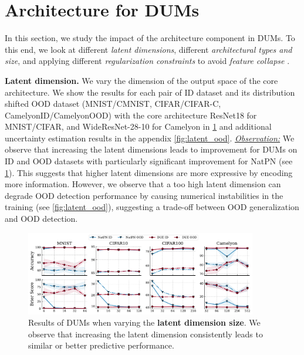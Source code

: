 \section{Architecture for DUMs}
\label{sec:architecture}

In this section, we study the impact of the architecture component in DUMs. To this end, we look at different \emph{latent dimensions}, different \emph{architectural types and size}, and applying different \emph{regularization constraints} to avoid \textit{feature collapse} \citep{van2021due}. 

\textbf{Latent dimension.} We vary the dimension of the output space of the core architecture. We show the results for each pair of ID dataset and its distribution shifted OOD dataset (MNIST/CMNIST, CIFAR/CIFAR-C, CamelyonID/CamelyonOOD) with the core architecture ResNet18 for MNIST/CIFAR, and WideResNet-28-10 for Camelyon in \cref{fig:latent} and additional uncertainty estimation results in the appendix \cref{fig:latent_ood}. \underline{\textit{Observation:}} We observe that increasing the latent dimensions leads to improvement for DUMs on ID and OOD datasets with particularly significant improvement for NatPN (see \cref{fig:latent}). This suggests that higher latent dimensions are more expressive by encoding more information. However, we observe that  a too high latent dimension can degrade OOD detection performance by causing numerical instabilities in the training (see \cref{fig:latent_ood}), suggesting a trade-off between OOD generalization and OOD detection.

\begin{figure}[!htb]
    \centering
    \includegraphics[width=0.9\textwidth]{sections/008_iclr2023/figures/latent.pdf}
    \caption{Results of DUMs when varying the \textbf{latent dimension size}. We observe that increasing the latent dimension consistently leads to similar or better predictive performance.}
    \label{fig:latent}
\end{figure}

